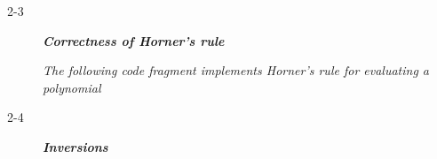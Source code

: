 \begin{description}
  \item[2-3] {\bfseries \itshape Correctness of Horner’s rule}

    {\itshape The following code fragment implements Horner’s rule for evaluating a polynomial}

    \begin{pbrev}
      
    \end{pbrev}

  \item[2-4] {\bfseries \itshape Inversions}

    \begin{pbrev}
      
    \end{pbrev}

\end{description}

